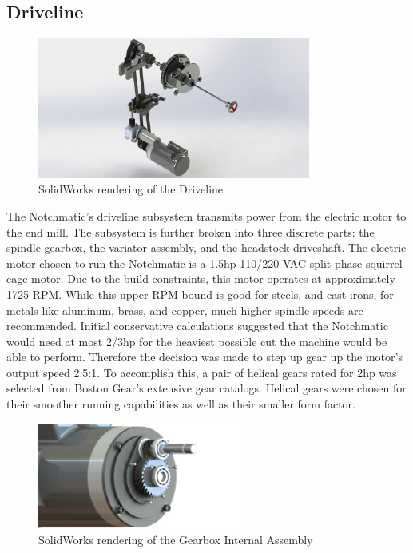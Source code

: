 \newpage

\subsection{Driveline}

\begin{figure}[H]
    \centering
    \includegraphics[width=0.8\textwidth]{./fall-report pictures/Chapter2-MachineDescription/Driveline}
    \caption{SolidWorks rendering of the Driveline}
    \label{fig:Driveline}
\end{figure}


The Notchmatic’s driveline subsystem transmits power from the electric motor to the end mill. The subsystem is further broken into three discrete parts: the spindle gearbox, the variator assembly, and the headstock driveshaft. The electric motor chosen to run the Notchmatic is a 1.5hp 110/220 VAC split phase squirrel cage motor. Due to the build constraints, this motor operates at approximately 1725 RPM. While this upper RPM bound is good for steels, and cast irons, for metals like aluminum, brass, and copper, much higher spindle speeds are recommended.  Initial conservative calculations suggested that the Notchmatic would need at most 2/3hp for the heaviest possible cut the machine would be able to perform. Therefore the decision was made to step up gear up the motor’s output speed 2.5:1.  To accomplish this, a pair of helical gears rated for 2hp was selected from Boston Gear’s extensive gear catalogs. Helical gears were chosen for their smoother running capabilities as well as their smaller form factor. 

\begin{figure}[H]
    \centering
    \includegraphics[width=0.6\textwidth]{./fall-report pictures/Chapter2-MachineDescription/GIA}
    \caption{SolidWorks rendering of the Gearbox Internal Assembly}
    \label{fig:GIA}
\end{figure}

